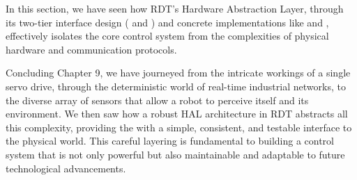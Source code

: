 In this section, we have seen how RDT's Hardware Abstraction Layer, through its two-tier interface design ( and ) and concrete implementations like  and , effectively isolates the core control system from the complexities of physical hardware and communication protocols.

Concluding Chapter 9, we have journeyed from the intricate workings of a single servo drive, through the deterministic world of real-time industrial networks, to the diverse array of sensors that allow a robot to perceive itself and its environment. We then saw how a robust HAL architecture in RDT abstracts all this complexity, providing the  with a simple, consistent, and testable interface to the physical world. This careful layering is fundamental to building a control system that is not only powerful but also maintainable and adaptable to future technological advancements.

